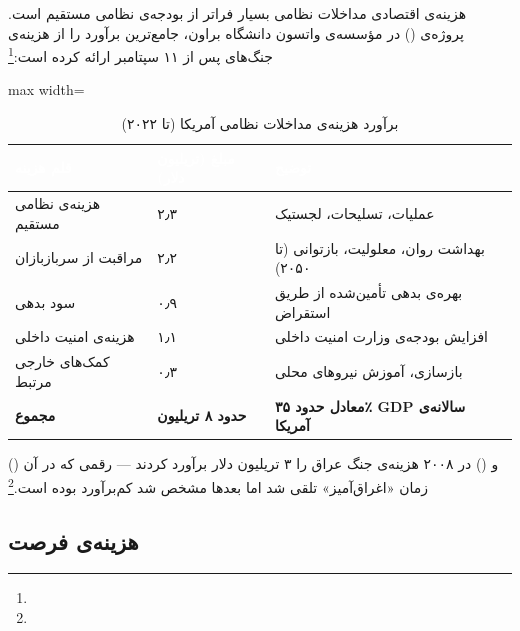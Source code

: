 هزینه‌ی اقتصادی مداخلات نظامی بسیار فراتر از بودجه‌ی نظامی مستقیم است. پروژه‌ی  () در مؤسسه‌ی واتسون دانشگاه براون، جامع‌ترین برآورد را از هزینه‌ی جنگ‌های پس از ۱۱ سپتامبر ارائه کرده است:\footnote{}

\begin{table}[htbp]
\centering
\caption{برآورد هزینه‌ی مداخلات نظامی آمریکا (تا ۲۰۲۲)}
\label{tab:ch12-costs}
\begin{adjustbox}{max width=\linewidth}
\begin{tabularx}{\linewidth}{
    >{\raggedleft\arraybackslash}p{3.5cm}
    >{\centering\arraybackslash}p{3.5cm}
    >{\raggedleft\arraybackslash}X
}
\toprule
\rowcolor{PrimaryDeep}
\textcolor{white}{\textbf{قلم هزینه}} &
\textcolor{white}{\textbf{مبلغ (تریلیون دلار)}} &
\textcolor{white}{\textbf{توضیح}} \\
\midrule
هزینه‌ی نظامی مستقیم & ۲٫۳ & عملیات، تسلیحات، لجستیک \\
\rowcolor{NeutralLight}
مراقبت از سربازبازان & ۲٫۲ & بهداشت روان، معلولیت، بازتوانی (تا ۲۰۵۰) \\
سود بدهی & ۰٫۹ & بهره‌ی بدهی تأمین‌شده از طریق استقراض \\
\rowcolor{NeutralLight}
هزینه‌ی امنیت داخلی & ۱٫۱ & افزایش بودجه‌ی وزارت امنیت داخلی \\
کمک‌های خارجی مرتبط & ۰٫۳ & بازسازی، آموزش نیروهای محلی \\
\rowcolor{NeutralLight}
\textbf{مجموع} & \textbf{حدود ۸ تریلیون} & \textbf{معادل حدود ۳۵٪ GDP سالانه‌ی آمریکا} \\
\bottomrule
\end{tabularx}
\end{adjustbox}
\end{table}

 () و  () در ۲۰۰۸ هزینه‌ی جنگ عراق را ۳ تریلیون دلار برآورد کردند — رقمی که در آن زمان «اغراق‌آمیز» تلقی شد اما بعدها مشخص شد کم‌برآورد بوده است.\footnote{}

\subsection{هزینه‌ی فرصت}
\label{subsec:ch12-opportunity-cost}

